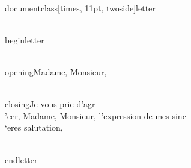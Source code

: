\\documentclass[times, 11pt, twoside]{letter}
\begin{document}
\\begin{letter}{}

\\opening{Madame, Monsieur,}



\\closing{Je vous prie d'agr\\'eer,
Madame, Monsieur, l'expression de mes sinc\\`eres salutation,}

\\end{letter}

\
\end{document}
